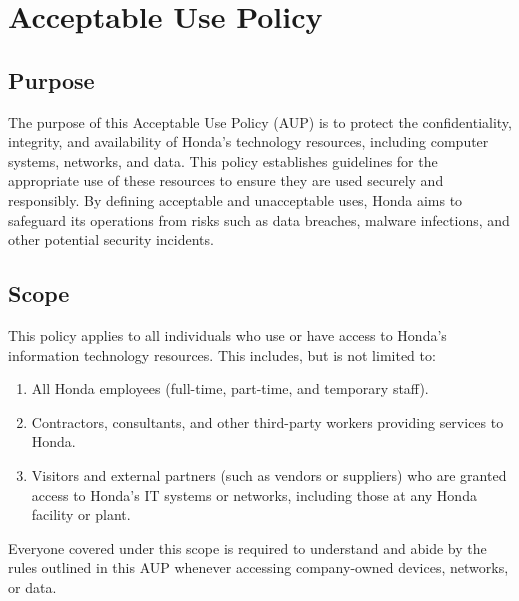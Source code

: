 \chapter{Acceptable Use Policy}\label{chap:acceptable-use}
\pagestyle{fancy}

\fancyhf{}

\fancyfoot[C]{\thepage}

\renewcommand{\headrulewidth}{0pt}
\renewcommand{\footrulewidth}{0pt}



\section{Purpose}
The purpose of this Acceptable Use Policy (AUP) is to protect the confidentiality, integrity, and availability of Honda's technology resources, including computer systems, networks, and data. This policy establishes guidelines for the appropriate use of these resources to ensure they are used securely and responsibly. By defining acceptable and unacceptable uses, Honda aims to safeguard its operations from risks such as data breaches, malware infections, and other potential security incidents.

\section{Scope}
This policy applies to all individuals who use or have access to Honda's information technology resources. This includes, but is not limited to:
\begin{enumerate}
    \item All Honda employees (full-time, part-time, and temporary staff).
    \item Contractors, consultants, and other third-party workers providing services to Honda.
    \item Visitors and external partners (such as vendors or suppliers) who are granted access to Honda's IT systems or networks, including those at any Honda facility or plant.
\end{enumerate}
Everyone covered under this scope is required to understand and abide by the rules outlined in this AUP whenever accessing company-owned devices, networks, or data.

